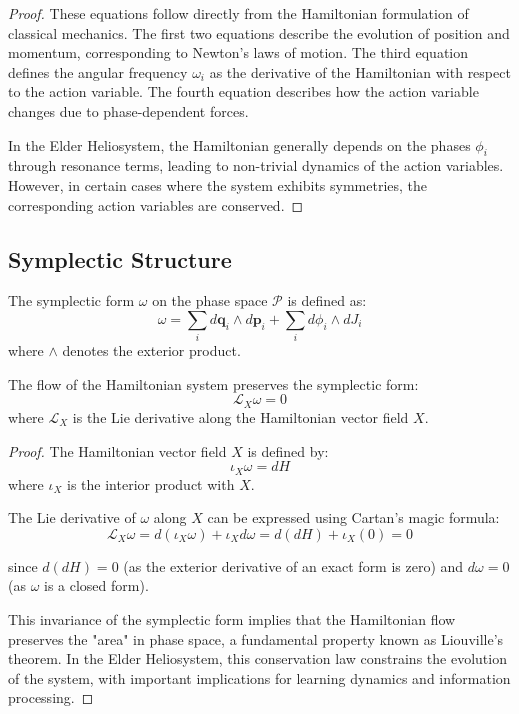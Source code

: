 \begin{proof}
These equations follow directly from the Hamiltonian formulation of classical mechanics. The first two equations describe the evolution of position and momentum, corresponding to Newton's laws of motion. The third equation defines the angular frequency $\omega_i$ as the derivative of the Hamiltonian with respect to the action variable. The fourth equation describes how the action variable changes due to phase-dependent forces.

In the Elder Heliosystem, the Hamiltonian generally depends on the phases $\phi_i$ through resonance terms, leading to non-trivial dynamics of the action variables. However, in certain cases where the system exhibits symmetries, the corresponding action variables are conserved.
\end{proof}

\subsection{Symplectic Structure}

\begin{definition}
The symplectic form $\omega$ on the phase space $\mathcal{P}$ is defined as:
\begin{equation}
\omega = \sum_i d\mathbf{q}_i \wedge d\mathbf{p}_i + \sum_i d\phi_i \wedge dJ_i
\end{equation}
where $\wedge$ denotes the exterior product.
\end{definition}

\begin{theorem}
The flow of the Hamiltonian system preserves the symplectic form:
\begin{equation}
\mathcal{L}_X \omega = 0
\end{equation}
where $\mathcal{L}_X$ is the Lie derivative along the Hamiltonian vector field $X$.
\end{theorem}

\begin{proof}
The Hamiltonian vector field $X$ is defined by:
\begin{equation}
\iota_X \omega = dH
\end{equation}
where $\iota_X$ is the interior product with $X$.

The Lie derivative of $\omega$ along $X$ can be expressed using Cartan's magic formula:
\begin{equation}
\mathcal{L}_X \omega = d(\iota_X \omega) + \iota_X d\omega = d(dH) + \iota_X(0) = 0
\end{equation}

since $d(dH) = 0$ (as the exterior derivative of an exact form is zero) and $d\omega = 0$ (as $\omega$ is a closed form).

This invariance of the symplectic form implies that the Hamiltonian flow preserves the "area" in phase space, a fundamental property known as Liouville's theorem. In the Elder Heliosystem, this conservation law constrains the evolution of the system, with important implications for learning dynamics and information processing.
\end{proof}


